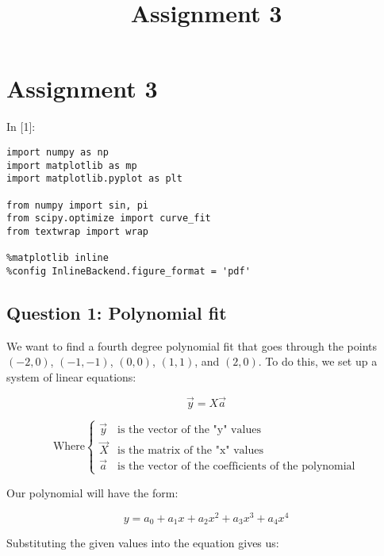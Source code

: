 \documentclass[11pt]{article}
\title{Assignment 3}
\newif\ifcode
\newif\ifleftmargins
\newlength{\promptlength}
\newcommand{\prompt}[3]{
        \needspace{1.1cm}
        \settowidth{\promptlength}{ #1 [#3] }
        \ifleftmargins\hspace{-\promptlength}\hspace{-5pt}\fi
        {\color{#2}#1 [#3]:}
        \ifleftmargins\vspace{-2.7ex}\fi
    }
\begin{document}
    
    
    
    
    

    
    \hypertarget{assignment-3}{%
\section{Assignment 3}\label{assignment-3}}

    
\prompt{In}{incolor}{1}
\codetrue
\begin{tcolorbox}[breakable, size=fbox, boxrule=1pt, pad at break*=1mm, colback=cellbackground, colframe=cellborder]
\begin{verbatim}
import numpy as np 
import matplotlib as mp
import matplotlib.pyplot as plt

from numpy import sin, pi
from scipy.optimize import curve_fit 
from textwrap import wrap

%matplotlib inline
%config InlineBackend.figure_format = 'pdf'
\end{verbatim}
\end{tcolorbox}
\codefalse

    \hypertarget{question-1-polynomial-fit}{%
\subsection{Question 1: Polynomial
fit}\label{question-1-polynomial-fit}}

    We want to find a fourth degree polynomial fit that goes through the
points \((-2, 0)\), \((-1, -1)\), \((0, 0)\), \((1, 1)\), and
\((2, 0)\). To do this, we set up a system of linear equations:

\[\vec{y} = X \vec{a}\]

\[\text{Where} \left\{ \begin{array}{ll}
            \vec{y}  & \text{is the vector of the "y" values} \\
            \vec{X}  & \text{is the matrix of the "x" values} \\
            \vec{a}  & \text{is the vector of the coefficients of the polynomial}
            \end{array} \right.\]

Our polynomial will have the form:

\[y = a_0 + a_1 x + a_2 x^2 + a_3 x^3 + a_4 x^4\]

Substituting the given values into the equation gives us:
\end{document}
